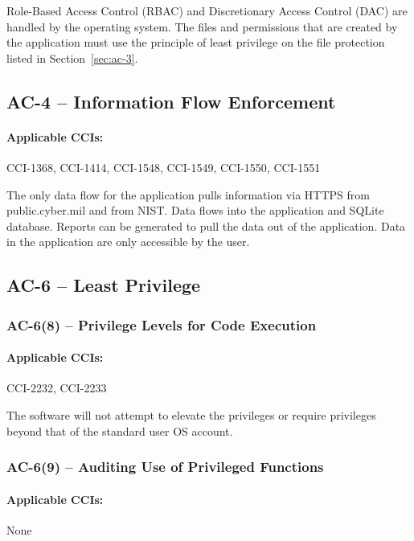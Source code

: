 \documentclass[letterpaper, 10pt, twoside]{article}
\begin{document}
Role-Based Access Control (RBAC) and Discretionary Access Control (DAC) are handled by the operating system. The files and permissions that are created by the application must use the principle of least privilege on the file protection listed in Section~\ref{sec:ac-3}.

\subsection{AC-4 -- Information Flow Enforcement}

\paragraph{Applicable CCIs:} CCI-1368, CCI-1414, CCI-1548, CCI-1549, CCI-1550, CCI-1551

The only data flow for the application pulls information via HTTPS from public.cyber.mil and from NIST. Data flows into the application and SQLite database. Reports can be generated to pull the data out of the application. Data in the application are only accessible by the user.

\subsection{AC-6 -- Least Privilege}
\label{sec:ac-6}

\subsubsection{AC-6(8) -- Privilege Levels for Code Execution}

\paragraph{Applicable CCIs:} CCI-2232, CCI-2233

The software will not attempt to elevate the privileges or require privileges beyond that of the standard user OS account.

\subsubsection{AC-6(9) -- Auditing Use of Privileged Functions}

\paragraph{Applicable CCIs:} None
\end{document}
